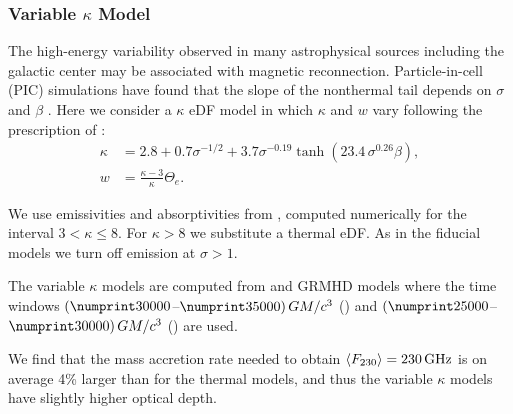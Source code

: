 \subsubsection{Variable \texorpdfstring{$\kappa$}{kappa} Model}

The high-energy variability observed in many astrophysical sources including the galactic center may be associated with
magnetic reconnection.
Particle-in-cell (PIC) simulations have found that the slope of the nonthermal tail depends on  $\sigma$ and $\beta$ \citep[see, e.g.,][]{2018ApJ...862...80B}.  Here we consider a $\kappa$ eDF model in which $\kappa$ and $w$ vary  following the prescription of \cite{2018ApJ...862...80B}:
\begin{align}
  \kappa &= 2.8 +0.7\sigma^{-1/2} + 3.7\sigma^{-0.19}\tanh{(23.4\,\sigma^{0.26}\beta)}, \label{eq:kappa}\\
  w      &= \frac{ \kappa -3 }{\kappa} \Theta_e.
\end{align}

We use emissivities and absorptivities from  \cite{2016ApJ...822...34P}, computed numerically for the interval $3 < \kappa \le 8$.
For $\kappa > 8$ we substitute a thermal eDF.
As in the fiducial models we turn off emission at $\sigma > 1$.

The variable $\kappa$ models are computed from \hamr and \bhac GRMHD models where the time windows
$(\no{30000}$--$\no{35000})\,\tg$ (\hamr) and
$(\no{25000}$--$\no{30000})\,\tg$ (\bhac) are used.

We find that the mass accretion rate needed to obtain $\langle F_{230} \rangle = 230\,\mathrm{GHz}$ is on average 4\% larger than for the thermal models, and thus the variable $\kappa$ models have slightly higher optical depth.

